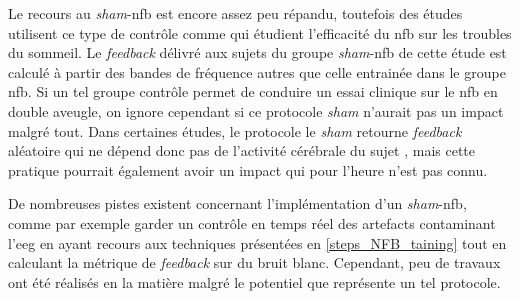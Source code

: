 Le recours au \textit{sham}-\gls{nfb} est encore assez peu répandu, toutefois des études utilisent ce type de contrôle comme \citet{Schabus2017}
qui étudient l'efficacité du \gls{nfb} sur les troubles du sommeil. Le \textit{feedback} délivré aux sujets du groupe \textit{sham}-\gls{nfb} de cette étude est calculé 
à partir des bandes de fréquence autres que celle entrainée dans le groupe \gls{nfb}. Si un tel groupe contrôle permet de conduire un essai clinique sur le \gls{nfb}
en double aveugle, on ignore cependant si ce protocole \textit{sham} n'aurait pas un impact malgré tout. Dans certaines études, le protocole le \textit{sham} retourne \textit{feedback} 
aléatoire qui ne dépend donc pas de l'activité cérébrale du sujet \citep{Arnold2014}, mais cette pratique pourrait également avoir un impact qui pour l'heure n'est pas connu.

De nombreuses pistes existent concernant l'implémentation d'un \textit{sham}-\gls{nfb}, comme par exemple garder un contrôle en temps réel des artefacts contaminant l'\gls{eeg} en 
ayant recours aux techniques présentées en \ref{steps_NFB_taining} tout 
en calculant la métrique de \textit{feedback} sur du bruit blanc. Cependant, peu de travaux ont été réalisés en la matière malgré le potentiel que représente 
un tel protocole. 


